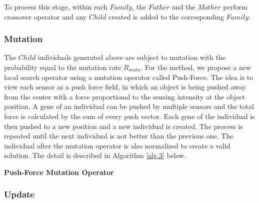\documentclass[final]{elsarticle}
\begin{document}
To process this stage, within each $ Family $, the $ Father $ and the $ Mother $ perform crossover operator and any $ Child $ created is added to the corresponding $ Family $.

\subsubsection{Mutation}

The $Child$ individuals generated above are subject to mutation with the probability equal to the mutation rate $R_{muta}$. For the method, we propose a new local search operator using a mutation operator called Push-Force. The idea is to view each sensor as a push force field, in which an object is being pushed away from the center with a force proportional to the sensing intensity at the object position. A gene of an individual can be pushed by multiple sensors and the total force is calculated by the sum of every push vector. Each gene of the individual is then pushed to a new position and a new individual is created. The process is repeated until the next individual is not better than the previous one. The individual after the mutation operator is also normalized to create a valid solution. The detail is described in Algorithm \ref{alg.3} below.
\begin{algorithm}[H]
	\SetAlgoLined
	\caption{\textbf{Push-Force Mutation Operator}} 
	\label{alg.3}
\end{algorithm} 

\subsubsection{Update}
\end{document}
